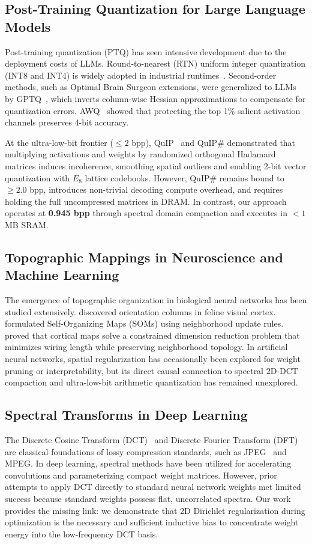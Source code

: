 \documentclass[11pt,a4paper]{article}
\begin{document}
\subsection{Post-Training Quantization for Large Language Models}
Post-training quantization (PTQ) has seen intensive development due to the deployment costs of LLMs. Round-to-nearest (RTN) uniform integer quantization (INT8 and INT4) is widely adopted in industrial runtimes~\citep{dettmers2022llmint8,xiao2023smoothquant}. Second-order methods, such as Optimal Brain Surgeon extensions, were generalized to LLMs by GPTQ~\citep{frantar2022gptq}, which inverts column-wise Hessian approximations to compensate for quantization errors. AWQ~\citep{lin2023awq} showed that protecting the top 1\% salient activation channels preserves 4-bit accuracy. 

At the ultra-low-bit frontier ($\le 2$ bpp), QuIP~\citep{chee2024quip} and QuIP\# demonstrated that multiplying activations and weights by randomized orthogonal Hadamard matrices induces incoherence, smoothing spatial outliers and enabling 2-bit vector quantization with $E_8$ lattice codebooks. However, QuIP\# remains bound to $\ge 2.0$ bpp, introduces non-trivial decoding compute overhead, and requires holding the full uncompressed matrices in DRAM. In contrast, our approach operates at \textbf{0.945 bpp} through spectral domain compaction and executes in $<1$ MB SRAM.

\subsection{Topographic Mappings in Neuroscience and Machine Learning}
The emergence of topographic organization in biological neural networks has been studied extensively. \citet{hubel1962receptive} discovered orientation columns in feline visual cortex. \citet{kohonen1982self} formulated Self-Organizing Maps (SOMs) using neighborhood update rules. \citet{durbin1990dimension} proved that cortical maps solve a constrained dimension reduction problem that minimizes wiring length while preserving neighborhood topology. In artificial neural networks, spatial regularization has occasionally been explored for weight pruning or interpretability, but its direct causal connection to spectral 2D-DCT compaction and ultra-low-bit arithmetic quantization has remained unexplored.

\subsection{Spectral Transforms in Deep Learning}
The Discrete Cosine Transform (DCT)~\citep{ahmed1974dct} and Discrete Fourier Transform (DFT) are classical foundations of lossy compression standards, such as JPEG~\citep{wallace1992jpeg} and MPEG. In deep learning, spectral methods have been utilized for accelerating convolutions and parameterizing compact weight matrices. However, prior attempts to apply DCT directly to standard neural network weights met limited success because standard weights possess flat, uncorrelated spectra. Our work provides the missing link: we demonstrate that 2D Dirichlet regularization during optimization is the necessary and sufficient inductive bias to concentrate weight energy into the low-frequency DCT basis.
\end{document}
